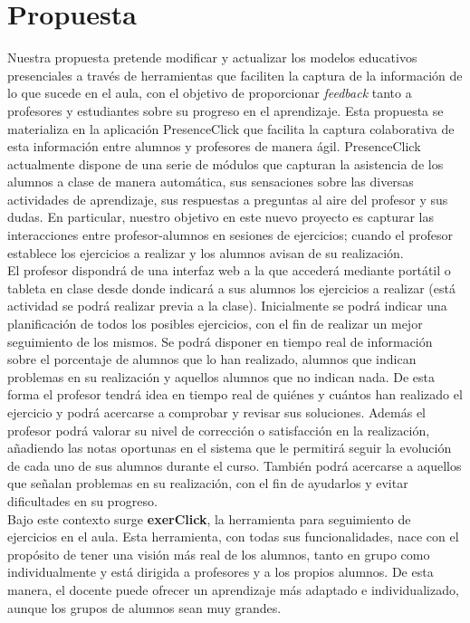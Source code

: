 \section{Propuesta}

Nuestra propuesta pretende modificar y actualizar los modelos educativos presenciales a través de herramientas que faciliten la captura de la información de lo que sucede en el aula, con el objetivo de proporcionar \textit{feedback} tanto a profesores y estudiantes sobre su progreso en el aprendizaje. Esta propuesta se materializa en la aplicación PresenceClick que facilita la captura colaborativa de esta información entre alumnos y profesores de manera ágil. PresenceClick actualmente dispone de una serie de módulos que capturan la asistencia de los alumnos a clase de manera automática, sus sensaciones sobre las diversas actividades de aprendizaje, sus respuestas a preguntas al aire del profesor y sus dudas. En particular, nuestro objetivo en este nuevo proyecto es capturar las interacciones entre profesor-alumnos en sesiones de ejercicios; cuando el profesor establece los ejercicios a realizar y los alumnos avisan de su realización.\\

El profesor dispondrá de una interfaz web a la que accederá mediante portátil o tableta en clase desde donde indicará a sus alumnos los ejercicios a realizar (está actividad se podrá realizar previa a la clase). Inicialmente se podrá indicar una planificación de todos los posibles ejercicios, con el fin de realizar un mejor seguimiento de los mismos. Se podrá disponer en tiempo real de información sobre el porcentaje de alumnos que lo han realizado, alumnos que indican problemas en su realización y aquellos alumnos que no indican nada. De esta forma el profesor tendrá idea en tiempo real de quiénes y cuántos han realizado el ejercicio y podrá acercarse a comprobar y revisar sus soluciones. Además el profesor podrá valorar su nivel de corrección o satisfacción en la realización, añadiendo las notas oportunas en el sistema que le permitirá seguir la evolución de cada uno de sus alumnos durante el curso. También podrá acercarse a aquellos que señalan problemas en su realización, con el fin de ayudarlos y evitar dificultades en su progreso.\\

Bajo este contexto surge \textbf{exerClick}, la herramienta para seguimiento de ejercicios en el aula. Esta herramienta, con todas sus funcionalidades, nace con el propósito de tener una visión más real de los alumnos, tanto en grupo como individualmente y está dirigida a profesores y a los propios alumnos. De esta manera, el docente puede ofrecer un aprendizaje más adaptado e individualizado, aunque los grupos de alumnos sean muy grandes.\\

